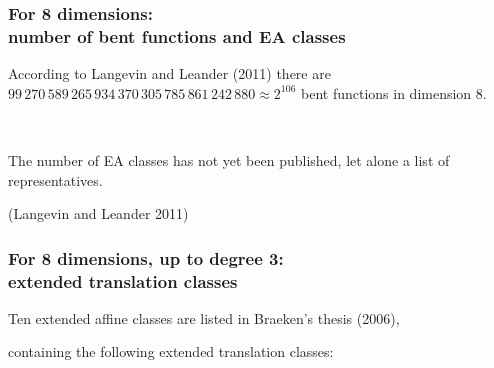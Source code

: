 \documentclass[pdf,sprung,slideColor,nocolorBG]{beamer}
\newenvironment{colortheme}[1]{
\def\ProvidesPackageRCS $##1${\relax}
\renewcommand{\ProcessOptions}{\relax}
\makeatletter

\makeatother
}{}
\newcommand{\slidecite}[1]{\tiny{(#1)}\normalsize{}}
\begin{document}
\begin{colortheme}{seagull}

\begin{frame}
\frametitle{For 8 dimensions: \\ number of bent functions and EA classes}

According to Langevin and Leander (2011)
there are $99\,270\,589\,265\,934\,370\,305\,785\,861\,242\,880 \approx 2^{106}$ bent functions in dimension 8.

~

The number of EA classes has not yet been published, let alone a list of representatives.

\slidecite{Langevin and Leander 2011}
\end{frame}

\begin{frame}
\frametitle{For 8 dimensions, up to degree 3: \\ extended translation classes}

Ten extended affine classes are listed in Braeken's thesis (2006),

containing the following extended translation classes:


\end{frame}
\end{colortheme}
\end{document}
